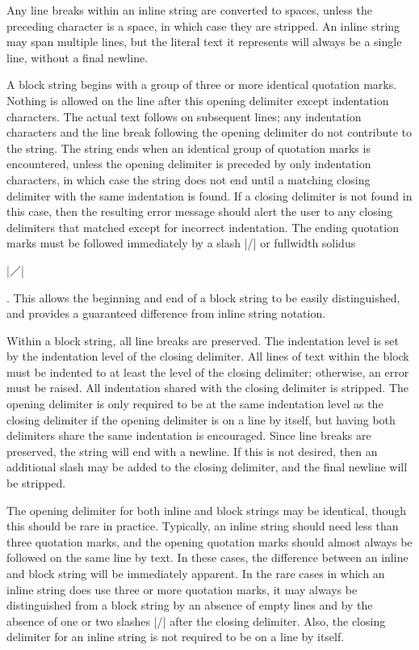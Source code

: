 \documentclass[11pt]{article}
\begin{document}
Any line breaks within an inline string are converted to spaces, unless the preceding character is a space, in which case they are stripped.  An inline string may span multiple lines, but the literal text it represents will always be a single line, without a final newline.  

A block string begins with a group of three or more identical quotation marks.  Nothing is allowed on the line after this opening delimiter except indentation characters.  The actual text follows on subsequent lines; any indentation characters and the line break following the opening delimiter do not contribute to the string.  The string ends when an identical group of quotation marks is encountered, unless the opening delimiter is preceded by only indentation characters, in which case the string does not end until a matching closing delimiter with the same indentation is found.  If a closing delimiter is not found in this case, then the resulting error message should alert the user to any closing delimiters that matched except for incorrect indentation.  The ending quotation marks must be followed immediately by a slash |/| or fullwidth solidus \begin{CJK*}{UTF8}{gkai}|／|\end{CJK*}.  This allows the beginning and end of a block string to be easily distinguished, and provides a guaranteed difference from inline string notation.

Within a block string, all line breaks are preserved.  The indentation level is set by the indentation level of the closing delimiter.  All lines of text within the block must be indented to at least the level of the closing delimiter; otherwise, an error must be raised.  All indentation shared with the closing delimiter is stripped.  The opening delimiter is only required to be at the same indentation level as the closing delimiter if the opening delimiter is on a line by itself, but having both delimiters share the same indentation is encouraged.  Since line breaks are preserved, the string will end with a newline.  If this is not desired, then an additional slash may be added to the closing delimiter, and the final newline will be stripped.

The opening delimiter for both inline and block strings may be identical, though this should be rare in practice.  Typically, an inline string should need less than three quotation marks, and the opening quotation marks should almost always be followed on the same line by text.  In these cases, the difference between an inline and block string will be immediately apparent.  In the rare cases in which an inline string does use three or more quotation marks, it may always be distinguished from a block string by an absence of empty lines and by the absence of one or two slashes |/| after the closing delimiter.  Also, the closing delimiter for an inline string is not required to be on a line by itself.
\end{document}
